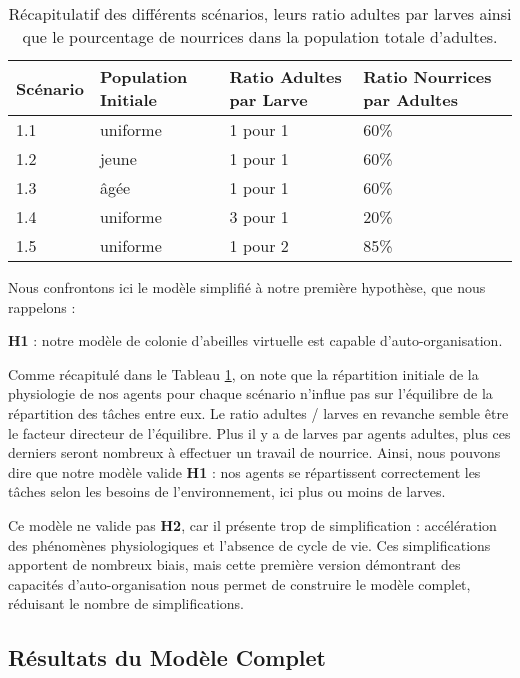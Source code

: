 	\begin{table}
		\centering
		\begin{tabular}{l|l|l|l}
    	Scénario & Population Initiale & Ratio Adultes par Larve & Ratio Nourrices par Adultes \\
   		\hline
   		1.1 & uniforme & 1 pour 1 & 60\% \\
   		1.2 & jeune & 1 pour 1 & 60\% \\
   		1.3 & âgée & 1 pour 1 & 60\% \\
   		1.4 & uniforme & 3 pour 1 & 20\% \\
   		1.5 & uniforme & 1 pour 2 & 85\% \\
		\end{tabular}	
		\caption{Récapitulatif des différents scénarios, leurs ratio adultes par larves ainsi que le pourcentage de nourrices dans la population totale d'adultes.}	
   		\label{TabEnvConstant}
	\end{table}	
	
		Nous confrontons ici le modèle simplifié à notre première hypothèse, que nous rappelons :
				
		\textbf{H1} : notre modèle de colonie d'abeilles virtuelle est capable d'auto-organisation.
		
		Comme récapitulé dans le Tableau \ref{TabEnvConstant}, on note que la répartition initiale de la physiologie de nos agents pour chaque scénario n'influe pas sur l'équilibre de la répartition des tâches entre eux. Le ratio adultes / larves en revanche semble être le facteur directeur de l'équilibre. Plus il y a de larves par agents adultes, plus ces derniers seront nombreux à effectuer un travail de nourrice. Ainsi, nous pouvons dire que notre modèle valide \textbf{H1} : nos agents se répartissent correctement les tâches selon les besoins de l'environnement, ici plus ou moins de larves.
		
		Ce modèle ne valide pas \textbf{H2}, car il présente trop de simplification : accélération des phénomènes physiologiques et l'absence de cycle de vie. Ces simplifications apportent de nombreux biais, mais cette première version démontrant des capacités d'auto-organisation nous permet de construire le modèle complet, réduisant le nombre de simplifications.
	
	\subsection{Résultats du Modèle Complet}		
		
